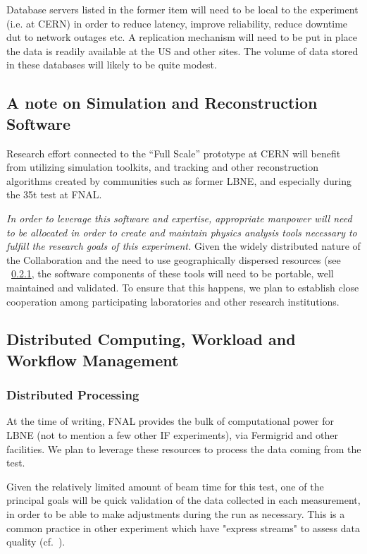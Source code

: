 Database servers listed in the former item will need to be local to the experiment (i.e. at CERN) in order to reduce latency, improve reliability, reduce
downtime dut to network outages etc. A replication mechanism will need to be put in place the data is readily available at the US and other sites.
The volume of data stored in these databases will likely to be quite modest.


\subsection{A note on Simulation and Reconstruction Software}
Research effort connected to the ``Full Scale'' prototype at CERN will benefit from utilizing simulation toolkits, and tracking and other reconstruction
algorithms created by communities such as former LBNE, and especially during the 35t test at FNAL.

\textit{In order to leverage this
software and expertise, appropriate manpower will need to be allocated in order to create and maintain physics analysis tools
necessary to fulfill the research goals of this experiment.} Given the widely distributed nature of the Collaboration and the need
to use geographically dispersed resources (see ~\ref{distr_proc},
the software components of these tools will need to be portable, well maintained and validated. To ensure that this happens,
we plan to establish close cooperation among participating laboratories and other research institutions.


\subsection{Distributed Computing, Workload and Workflow Management}
\subsubsection{Distributed Processing}
\label{distr_proc}
At the time of writing, FNAL provides the bulk of computational power for LBNE (not to mention a few other IF experiments), via Fermigrid and other facilities.
We plan to leverage these resources to process the data coming from the test.

Given the relatively limited amount of beam time for this test, one of the principal goals will be quick validation of the data collected in each measurement, in
order to be able to make adjustments during the run as necessary. This is a common practice in other experiment which have "express streams" to assess data
quality (cf.~\cite{atlas_express}).

